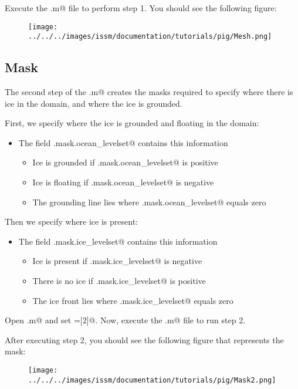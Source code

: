 Execute the \verb@runme.m@ file to perform step 1. You should see the following figure:
\begin{figure}[H]
	\begin{center}
	\texttt{[image: ../../../images/issm/documentation/tutorials/pig/Mesh.png]}
	\end{center}
\end{figure}
\subsection{Mask}%
The second step of the \verb@runme.m@ creates the masks required to specify where there is ice in the domain, and where the ice is grounded.

First, we specify where the ice is grounded and floating in the domain:
\begin{itemize}
	\item The field \verb@md.mask.ocean_levelset@ contains this information
		\begin{itemize}
			\item Ice is grounded if \verb@md.mask.ocean_levelset@ is positive
			\item Ice is floating if \verb@md.mask.ocean_levelset@ is negative
			\item The grounding line lies where \verb@md.mask.ocean_levelset@ equals zero
		\end{itemize}
\end{itemize}

Then we specify where ice is present:
\begin{itemize}
	\item The field \verb@md.mask.ice_levelset@ contains this information
		\begin{itemize}
			\item Ice is present if \verb@md.mask.ice_levelset@ is negative
			\item There is no ice if \verb@md.mask.ice_levelset@ is positive
			\item The ice front lies where \verb@md.mask.ice_levelset@ equals zero
		\end{itemize}
\end{itemize}

Open \verb@runme.m@ and set \verb@steps=[2]@. Now, execute the \verb@runme.m@ file to run step 2.

After executing step 2, you should see the following figure that represents the mask:
\begin{figure}[H]
	\begin{center}
		\texttt{[image: ../../../images/issm/documentation/tutorials/pig/Mask2.png]}
	\end{center}
\end{figure}
